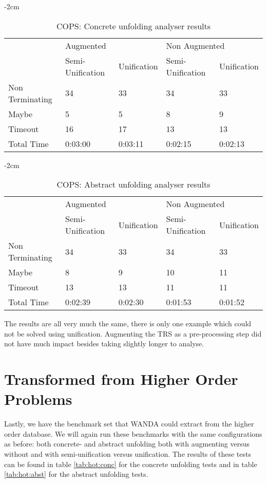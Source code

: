 \begin{table}[ht]
    \centering
    \addtolength{\leftskip} {-2cm}
    \addtolength{\rightskip}{-2cm}

    \begin{tabular}{|l|l|l|l|l|}
    \cline{2-5} 
    \multicolumn{1}{c|}{} & \multicolumn{2}{l|}{Augmented} & \multicolumn{2}{l|}{Non Augmented} \\ \cline{2-5} 
    \multicolumn{1}{c|}{} & Semi-Unification & Unification & Semi-Unification & Unification \\ \hline
    Non Terminating & 34 & 33 & 34 & 33 \\ \hline
    Maybe & 5 & 5 & 8 & 9\\ \hline
    Timeout & 16 & 17 & 13 & 13 \\ \hline
    Total Time & 0:03:00 & 0:03:11 & 0:02:15 & 0:02:13 \\ \hline
    \end{tabular}
    \caption{COPS: Concrete unfolding analyser results}
\label{tab:cops:conc}

\end{table}
\begin{table}[ht]
    \centering
    \addtolength{\leftskip} {-2cm}
    \addtolength{\rightskip}{-2cm}

    \begin{tabular}{|l|l|l|l|l|}
    \cline{2-5} 
    \multicolumn{1}{c|}{} & \multicolumn{2}{l|}{Augmented} & \multicolumn{2}{l|}{Non Augmented} \\ \cline{2-5} 
    \multicolumn{1}{c|}{} & Semi-Unification & Unification & Semi-Unification & Unification \\ \hline
    Non Terminating & 34 & 33 & 34 & 33 \\ \hline
    Maybe & 8 & 9 & 10 & 11 \\ \hline
    Timeout & 13 & 13 & 11 & 11 \\ \hline
    Total Time & 0:02:39 & 0:02:30 & 0:01:53 & 0:01:52 \\ \hline
    \end{tabular}
    \caption{COPS: Abstract unfolding analyser results}
    \label{tab:cops:abst}
\end{table}

The results are all very much the same, there is only one example which could not be solved using unification. Augmenting the TRS as a pre-processing step did not have much impact besides taking slightly longer to analyse. 

\section{Transformed from Higher Order Problems}
Lastly, we have the benchmark set that WANDA\cite{KOP:WANDASITE} could extract from the higher order database. We will again run these benchmarks with the same configurations as before: both concrete- and abstract unfolding both with augmenting versus without and with semi-unification versus unification. The results of these tests can be found in table \ref{tab:hot:conc} for the concrete unfolding tests and in table \ref{tab:hot:abst} for the abstract unfolding tests.  

